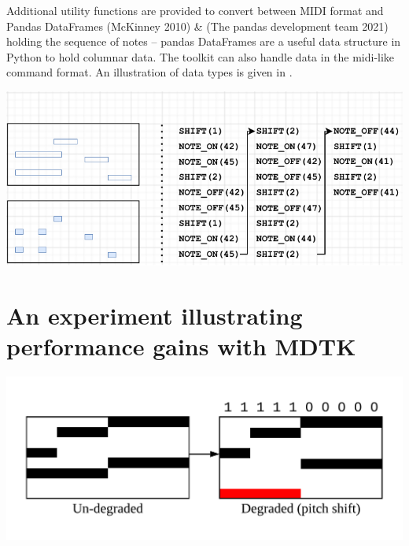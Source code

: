 \documentclass[12pt,a4paper,]{report}
\let\origfigure=\figure
\let\endorigfigure=\endfigure
\renewenvironment{figure}[1][]{%
\origfigure[b]
}{%
\endorigfigure
}
\begin{document}
Additional utility functions are provided to convert between MIDI format
and Pandas DataFrames (McKinney 2010) \& (The pandas development team
2021) holding the sequence of notes -- pandas DataFrames are a useful
data structure in Python to hold columnar data. The toolkit can also
handle data in the midi-like command format. An illustration of data
types is given in .

\begin{figure}[htbp]
\centering
\includegraphics[width=1.0\textwidth]{source/figures/dataformats.pdf}
\caption[Different data formats handled by MDTK]{Data formats – On the left, a piano roll, on the right, the same data expressed as a sequence of commands. The piano roll has two parts - the first (shown above) indicates where notes are sounding, the second (shown below) shows where note onsets are happening.}\label{fig:data_formats}
\end{figure}

\hypertarget{an-experiment-illustrating-performance-gains-with-mdtk}{%
\section{An experiment illustrating performance gains with
MDTK}\label{an-experiment-illustrating-performance-gains-with-mdtk}}

\begin{figure}[htbp]
\centering
\includegraphics[width=1.0\textwidth]{source/figures/example.png}
\caption[Example MDTK degradation]{TODO: it’s not clear that we need this…leaving here for now. An example degradation performed by MDTK}\label{fig:mdtk_degradation_example}
\end{figure}
\end{document}
